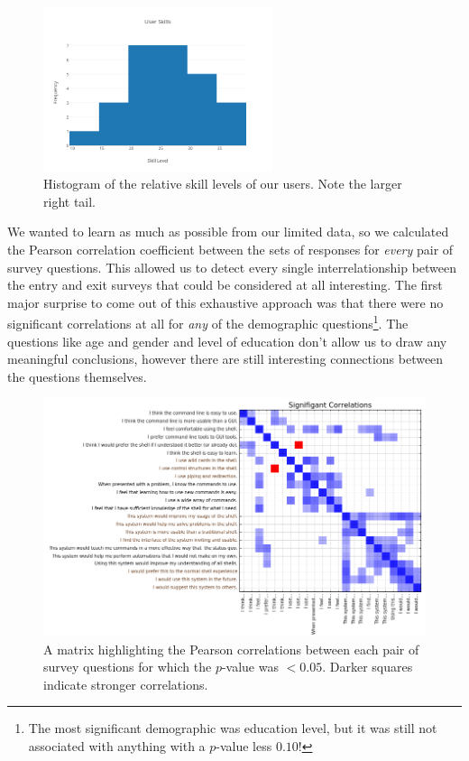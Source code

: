 \begin{figure}[H]
  \centering
  \includegraphics[width=0.6\textwidth]{figures/stats/user-skills.png}
  \caption{Histogram of the relative skill levels of our users. Note the larger
    right tail.}
  \label{fig:skillz}
\end{figure}

We wanted to learn as much as possible from our limited data, so we calculated
the Pearson correlation coefficient between the sets of responses for
\emph{every} pair of survey questions. This allowed us to detect every single
interrelationship between the entry and exit surveys that could be considered at
all interesting. The first major surprise to come out of this exhaustive
approach was that there were no significant correlations at all for \emph{any}
of the demographic questions\footnote{The most significant demographic was
  education level, but it was still not associated with anything with a
  $p$-value less $0.10$!}. The questions like age and gender and level of
education don't allow us to draw any meaningful conclusions, however there are
still interesting connections between the questions themselves.

\begin{figure}[ht]
  \centering
  \includegraphics[width=\textwidth]{figures/stats/sig.png}
  \caption{A matrix highlighting the Pearson correlations between each pair of
    survey questions for which the $p$-value was $< 0.05$. Darker squares
    indicate stronger correlations.}
  \label{fig:pvalplot}
\end{figure}

